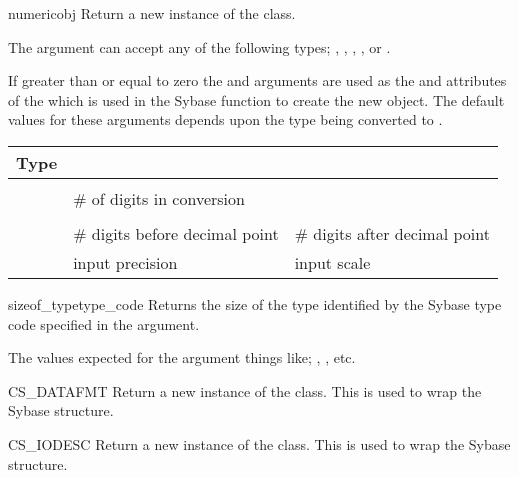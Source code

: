 \begin{funcdesc}{numeric}{obj  }
Return a new instance of the  class.

The  argument can accept any of the following types;
, , , ,
or .

If greater than or equal to zero the  and 
arguments are used as the  and 
attributes of the  which is used in the Sybase
 function to create the new 
object.  The default values for these arguments depends upon the type
being converted to .

\begin{longtable}{l|l|l}
Type & \var{precision} & \var{scale} \\
\hline
\code{IntType}     & \code{16} & \code{0} \\
\code{LongType}    & \# of digits in \code{str()} conversion & \code{0} \\
\code{FloatType}   & \code{CS_MAX_PREC} & \code{12} \\
\code{StringType}  & \# digits before decimal point & \# digits after decimal point \\
\code{NumericType} & input precision & input scale \\
\end{longtable}
\end{funcdesc}

\begin{funcdesc}{sizeof_type}{type_code}
Returns the size of the type identified by the Sybase type code
specified in the  argument.

The values expected for the  argument things like;
, , etc.
\end{funcdesc}

\begin{funcdesc}{CS_DATAFMT}{}
Return a new instance of the  class.  This is used
to wrap the Sybase  structure.
\end{funcdesc}

\begin{funcdesc}{CS_IODESC}{}
Return a new instance of the  class.  This is used
to wrap the Sybase  structure.
\end{funcdesc}


